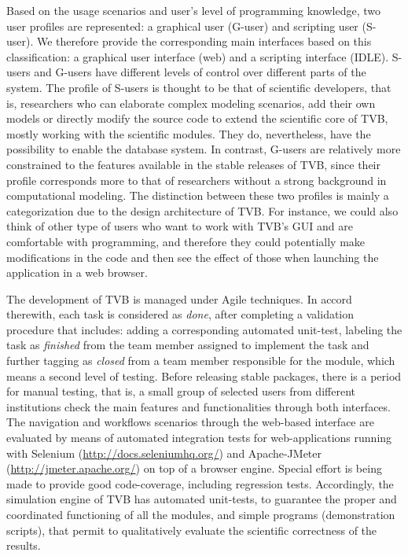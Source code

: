 \documentclass{bioinfo}
\begin{document}
\begin{methods}
    Based on the usage scenarios and user's level of programming knowledge, two
    user profiles are represented: a graphical user (G-user) and scripting user
    (S-user).  We therefore provide the corresponding main interfaces based on
    this  classification: a graphical user interface (web) and a scripting
    interface (IDLE). S-users and G-users have different levels of control over
    different parts of the system.  The profile of S-users is thought to be that
    of scientific developers, that is, researchers who can elaborate complex
    modeling scenarios, add their own models or directly modify the source code
    to extend the scientific core of TVB, mostly working with the scientific
    modules.  They do, nevertheless, have the possibility to enable the database
    system. In contrast, G-users are relatively more constrained to the features
    available in the stable releases of TVB, since their profile corresponds
    more to that of researchers without a strong background in computational
    modeling. The distinction between these two profiles is mainly a
    categorization due to the design architecture of TVB. For instance, we could
    also think of other type of users who want to work with TVB's GUI and are
    comfortable with programming, and therefore they could potentially make
    modifications in the code and then see the effect of those when launching
    the application in a web browser.

    The development of TVB is managed under Agile techniques. In
    accord therewith, each task is considered as \emph{done}, after completing a validation
    procedure that includes: adding a corresponding automated unit-test, labeling the
    task as \emph{finished} from the team member assigned to implement
    the task and further tagging as \emph{closed} from a team member
    responsible for the module, which means a second level of testing. Before
    releasing stable packages, there is a period for manual testing, that is, a
    small group of selected users from different institutions check the main
    features and functionalities through both interfaces. The navigation and workflows scenarios
    through the web-based interface are evaluated by means of automated
    integration tests for web-applications running with Selenium
    (\url{http://docs.seleniumhq.org/}) and Apache-JMeter
    (\url{http://jmeter.apache.org/}) on top of a browser engine. 
    Special effort is being made to provide good code-coverage, including regression tests. Accordingly, the
    simulation engine of TVB has automated unit-tests, to guarantee the proper and
    coordinated functioning of all the modules, and simple programs
    (demonstration scripts), that permit to qualitatively evaluate 
    the scientific correctness of the results.
    

\end{methods}
\end{document}
